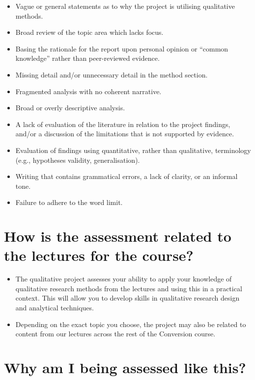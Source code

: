 \documentclass[
  english,
  letterpaper,
  DIV=11,
  numbers=noendperiod]{scrreprt}
\begin{document}
\begin{itemize}
\item
  Vague or general statements as to why the project is utilising
  qualitative methods.
\item
  Broad review of the topic area which lacks focus.
\item
  Basing the rationale for the report upon personal opinion or ``common
  knowledge'' rather than peer-reviewed evidence.
\item
  Missing detail and/or unnecessary detail in the method section.
\item
  Fragmented analysis with no coherent narrative.
\item
  Broad or overly descriptive analysis.
\item
  A lack of evaluation of the literature in relation to the project
  findings, and/or a discussion of the limitations that is not supported
  by evidence.
\item
  Evaluation of findings using quantitative, rather than qualitative,
  terminology (e.g., hypotheses validity, generalisation).
\item
  Writing that contains grammatical errors, a lack of clarity, or an
  informal tone.
\item
  Failure to adhere to the word limit.
\end{itemize}

\section{How is the assessment related to the lectures for the
course?}\label{how-is-the-assessment-related-to-the-lectures-for-the-course}

\begin{itemize}
\item
  The qualitative project assesses your ability to apply your knowledge
  of qualitative research methods from the lectures and using this in a
  practical context. This will allow you to develop skills in
  qualitative research design and analytical techniques.
\item
  Depending on the exact topic you choose, the project may also be
  related to content from our lectures across the rest of the Conversion
  course.
\end{itemize}

\section{Why am I being assessed like
this?}\label{why-am-i-being-assessed-like-this-3}
\end{document}
